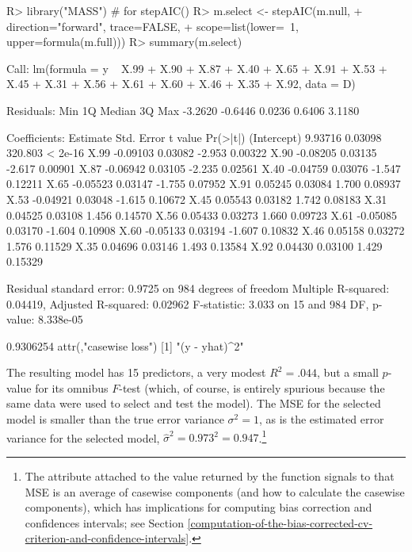 \documentclass[
]{jss}
\begin{document}
\begin{CodeChunk}
\begin{CodeInput}
R> library("MASS")  # for stepAIC()
R> m.select <- stepAIC(m.null,
+                     direction="forward", trace=FALSE,
+                     scope=list(lower=~1, upper=formula(m.full)))
R> summary(m.select)
\end{CodeInput}
\begin{CodeOutput}

Call:
lm(formula = y ~ X.99 + X.90 + X.87 + X.40 + X.65 + X.91 + X.53 + 
    X.45 + X.31 + X.56 + X.61 + X.60 + X.46 + X.35 + X.92, data = D)

Residuals:
    Min      1Q  Median      3Q     Max 
-3.2620 -0.6446  0.0236  0.6406  3.1180 

Coefficients:
            Estimate Std. Error t value Pr(>|t|)
(Intercept)  9.93716    0.03098 320.803  < 2e-16
X.99        -0.09103    0.03082  -2.953  0.00322
X.90        -0.08205    0.03135  -2.617  0.00901
X.87        -0.06942    0.03105  -2.235  0.02561
X.40        -0.04759    0.03076  -1.547  0.12211
X.65        -0.05523    0.03147  -1.755  0.07952
X.91         0.05245    0.03084   1.700  0.08937
X.53        -0.04921    0.03048  -1.615  0.10672
X.45         0.05543    0.03182   1.742  0.08183
X.31         0.04525    0.03108   1.456  0.14570
X.56         0.05433    0.03273   1.660  0.09723
X.61        -0.05085    0.03170  -1.604  0.10908
X.60        -0.05133    0.03194  -1.607  0.10832
X.46         0.05158    0.03272   1.576  0.11529
X.35         0.04696    0.03146   1.493  0.13584
X.92         0.04430    0.03100   1.429  0.15329

Residual standard error: 0.9725 on 984 degrees of freedom
Multiple R-squared:  0.04419,   Adjusted R-squared:  0.02962 
F-statistic: 3.033 on 15 and 984 DF,  p-value: 8.338e-05
\end{CodeOutput}
\begin{CodeOutput}
[1] 0.9306254
attr(,"casewise loss")
[1] "(y - yhat)^2"
\end{CodeOutput}
\end{CodeChunk}

The resulting model has 15 predictors, a very modest \(R^2 = .044\), but
a small \(p\)-value for its omnibus \(F\)-test (which, of course, is
entirely spurious because the same data were used to select and test the
model). The MSE for the selected model is smaller than the true error
variance \(\sigma^2 = 1\), as is the estimated error variance for the
selected model, \(\widehat{\sigma}^2 = 0.973^2 = 0.947\).\footnote{The
   attribute attached to the value returned by the
   function signals to  that MSE is an average of
  casewise components (and how to calculate the casewise components),
  which has implications for computing bias correction and confidences
  intervals; see Section
  \ref{computation-of-the-bias-corrected-cv-criterion-and-confidence-intervals}.}
\end{document}
